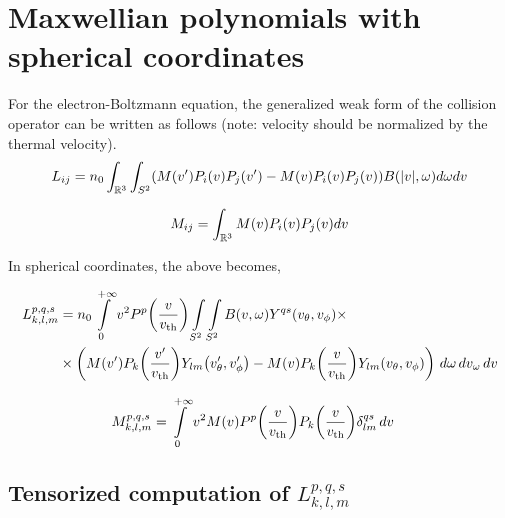 \documentclass{article}
\begin{document}
\section{Maxwellian polynomials with spherical coordinates}

For the electron-Boltzmann equation, the generalized weak form of the collision operator can be written as follows (note: velocity should be normalized by the thermal velocity).
\begin{equation}
    L_{ij} = n_0 \int_{\mathbb{R}^3} \int_{S^2} (M(v^\prime) P_i(v)P_j(v^\prime)  - M(v) P_i(v) P_j(v) )  B(|v|,\omega) d\omega dv \label{eq:cOp}
\end{equation}

\begin{equation}
    M_{ij} = \int_{\mathbb{R}^3} M(v) P_i(v)P_j(v) dv
\end{equation}

In spherical coordinates, the above becomes, 

\begin{align*}
    {L}_{k,l,m}^{p,q,s} &=n_0
    \myint_{0}^{+\infty} 
    v^2
    P^p \of{\frac{v}{\vth}} 
    \myint_{S^2}^{}
    \myint_{S^2}^{}
    B\of{v,\omega} Y^{qs}\of{v_\theta, v_\phi} 
     \times
    \\
    & \times
    \left(
    M\of{v^\prime} P_k\of{\frac{v^\prime}{\vth}} Y_{lm}\of{v_\theta^\prime, v_\phi^\prime}
    -
    M\of{v} P_k\of{\frac{v}{\vth}} Y_{lm}\of{v_\theta, v_\phi}
    \right)
    \diff{\omega}
    \diff{v_\omega}
    \diff{v} 
\end{align*}

\begin{align*}
    {M}_{k,l,m}^{p,q,s} &=
    \myint_{0}^{+\infty} 
    v^2
    M\of{v} P^p \of{\frac{v}{\vth}}  P_k \of{\frac{v}{\vth}} \delta^{qs}_{lm}
    \diff{v} 
\end{align*}

\subsection{Tensorized computation of ${L}_{k,l,m}^{p,q,s}$}
\end{document}

